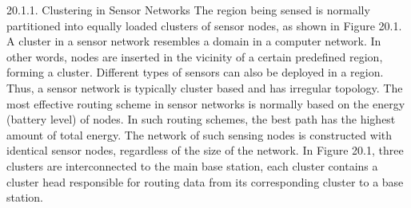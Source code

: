 20.1.1. Clustering in Sensor Networks
The region being sensed is normally partitioned into equally loaded clusters of sensor nodes, as shown in Figure 20.1. A cluster in a sensor network resembles a domain in a computer network. In other words, nodes are inserted in the vicinity of a certain predefined region, forming a cluster. Different types of sensors can also be deployed in a region. Thus, a sensor network is typically cluster based and has irregular topology. The most effective routing scheme in sensor networks is normally based on the energy (battery level) of nodes. In such routing schemes, the best path has the highest amount of total energy. The network of such sensing nodes is constructed with identical sensor nodes, regardless of the size of the network. In Figure 20.1, three clusters are interconnected to the main base station, each cluster contains a cluster head responsible for routing data from its corresponding cluster to a base station.
\newpage

